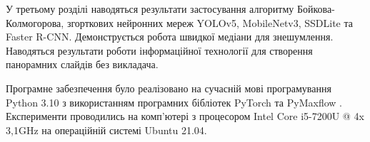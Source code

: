 У третьому розділі наводяться результати 
застосування алгоритму Бойкова-Колмогорова,
згорткових нейронних мереж  YOLOv5, MobileNetv3, SSDLite та
Faster R-CNN. Демонструється робота швидкої медіани для знешумлення. 
Наводяться результати роботи інформаційної технології для створення 
панорамних слайдів без викладача.

Програмне забезпечення було реалізовано
на сучасній мові програмування Python 3.10 \cite{python_language}
з використанням програмних бібліотек PyTorch \cite{pytorch_library} та PyMaxflow \cite{pymaxflow_library}.
Експерименти проводились на комп'ютері з
процесором Intel Core i5-7200U @ 4x 3,1GHz на операційній системі Ubuntu 21.04.
